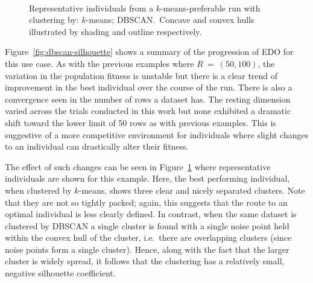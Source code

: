 \documentclass[11pt]{article}
\newlength{\imgwidth}
\begin{document}
\begin{figure}[htbp]
    \centering
    \\
    \caption[]{%
        Representative individuals from a \(k\)-means-preferable run with
        clustering by:  \(k\)-means;
         DBSCAN.\ Concave and convex hulls illustrated
        by shading and outline respectively. 
    }\label{fig:dbscan-inds}
\end{figure}

Figure~\ref{fig:dbscan-silhouette} shows a summary of the progression of EDO
for this use case. As with the previous examples where \(R~=~(50, 100)\), the
variation in the population fitness is unstable but there is a clear trend of
improvement in the best individual over the course of the run. There is also a
convergence seen in the number of rows a dataset has. The resting dimension
varied across the trials conducted in this work but none exhibited a dramatic
shift toward the lower limit of 50 rows as with previous examples. This is
suggestive of a more competitive environment for individuals where slight
changes to an individual can drastically alter their fitness.

The effect of such changes can be seen in Figure~\ref{fig:dbscan-inds} where
representative individuals are shown for this example. Here, the best performing
individual, when clustered by \(k\)-means, shows three clear and nicely
separated clusters. Note that they are not so tightly packed; again, this
suggests that the route to an optimal individual is less clearly defined. In
contrast, when the same dataset is clustered by DBSCAN a single cluster is found
with a single noise point held within the convex hull of the cluster, i.e.\
there are overlapping clusters (since noise points form a single cluster).
Hence, along with the fact that the larger cluster is widely spread, it follows
that the clustering has a relatively small, negative silhouette coefficient.
\end{document}
